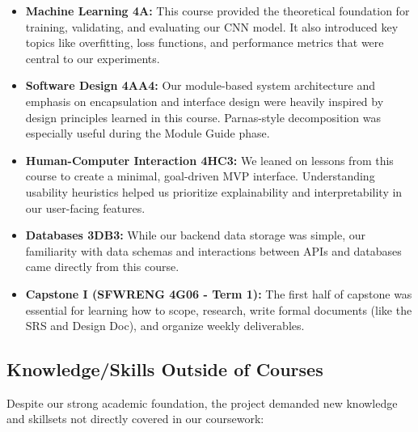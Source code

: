 \documentclass{article}
\begin{document}
\begin{itemize}
    \item \textbf{Machine Learning 4A:} This course provided the theoretical foundation for training, validating, and evaluating our CNN model. It also introduced key topics like overfitting, loss functions, and performance metrics that were central to our experiments.
    
    \item \textbf{Software Design 4AA4:} Our module-based system architecture and emphasis on encapsulation and interface design were heavily inspired by design principles learned in this course. Parnas-style decomposition was especially useful during the Module Guide phase.
    
    \item \textbf{Human-Computer Interaction 4HC3:} We leaned on lessons from this course to create a minimal, goal-driven MVP interface. Understanding usability heuristics helped us prioritize explainability and interpretability in our user-facing features.
    
    \item \textbf{Databases 3DB3:} While our backend data storage was simple, our familiarity with data schemas and interactions between APIs and databases came directly from this course.
    
    \item \textbf{Capstone I (SFWRENG 4G06 - Term 1):} The first half of capstone was essential for learning how to scope, research, write formal documents (like the SRS and Design Doc), and organize weekly deliverables.
\end{itemize}

\subsection{Knowledge/Skills Outside of Courses}

Despite our strong academic foundation, the project demanded new knowledge and skillsets not directly covered in our coursework:
\end{document}

